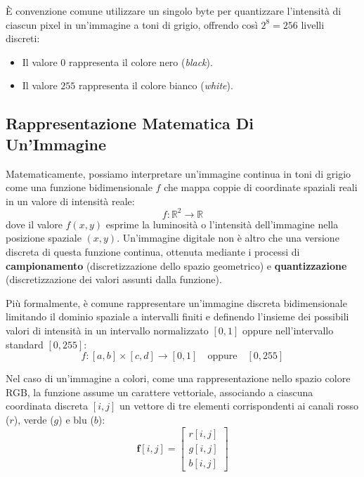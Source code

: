 ﻿\documentclass[11pt, a4paper]{article}
\begin{document}

È convenzione comune utilizzare un singolo byte per quantizzare l'intensità di ciascun pixel in un'immagine a toni di grigio, offrendo così $2^8 = 256$ livelli discreti:
\begin{itemize}
    \item Il valore $0$ rappresenta il colore nero (\emph{black}).
    \item Il valore $255$ rappresenta il colore bianco (\emph{white}).
\end{itemize}

\subsection{Rappresentazione Matematica Di Un'Immagine}

Matematicamente, possiamo interpretare un'immagine continua in toni di grigio come una funzione bidimensionale $f$ che mappa coppie di coordinate spaziali reali in un valore di intensità reale:
\[ f: \mathbb{R}^2 \to \mathbb{R} \]
dove il valore $f(x,y)$ esprime la luminosità o l'intensità dell'immagine nella posizione spaziale $(x,y)$. Un'immagine digitale non è altro che una versione discreta di questa funzione continua, ottenuta mediante i processi di \textbf{campionamento} (discretizzazione dello spazio geometrico) e \textbf{quantizzazione} (discretizzazione dei valori assunti dalla funzione).


Più formalmente, è comune rappresentare un'immagine discreta bidimensionale limitando il dominio spaziale a intervalli finiti e definendo l'insieme dei possibili valori di intensità in un intervallo normalizzato $[0, 1]$ oppure nell'intervallo standard $[0, 255]$:
\[ f: [a, b] \times [c, d] \to [0, 1] \quad \text{oppure} \quad [0, 255] \]

Nel caso di un'immagine a colori, come una rappresentazione nello spazio colore RGB, la funzione assume un carattere vettoriale, associando a ciascuna coordinata discreta $[i, j]$ un vettore di tre elementi corrispondenti ai canali rosso ($r$), verde ($g$) e blu ($b$):
\[ \bm{f}[i, j] = \begin{bmatrix} r[i, j] \\ g[i, j] \\ b[i, j] \end{bmatrix} \]
\end{document}
